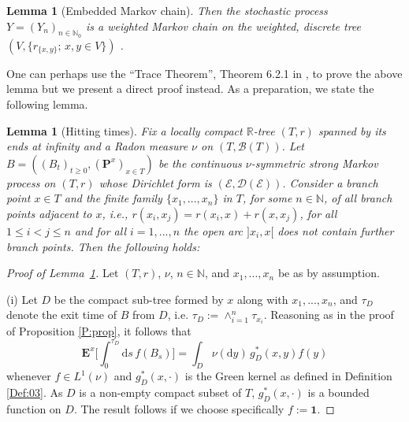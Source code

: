 \documentclass[11pt]{amsart}
\numberwithin{equation}{section}
\newtheorem{lemma}[definition]{Lemma}
\begin{document}
{\begin{lemma}[Embedded Markov chain]
Then the stochastic process $Y=(Y_n)_{n\in\mathbb{N}_0}$ is a weighted Markov chain on the
weighted, discrete tree $(V,\{r_{\{x,y\}};\,x,y\in V\})$ .
\end{lemma}{\smallskip}

One can perhaps use the ``Trace Theorem'', Theorem 6.2.1 in \cite{FukushimaOshimaTakeda1994},  to prove the above lemma but we present a direct proof instead. As a preparation, we state the following lemma.
\begin{lemma}[Hitting times]
Fix a locally compact ${{\mathbb R}}$-tree $(T,r)$ {spanned by its ends at infinity} and a Radon measure $\nu$ on $(T,{\mathcal B}(T))$.
Let $B=((B_t)_{t\ge 0},({\mathbf P}^x)_{x\in T})$ be the continuous $\nu$-symmetric strong Markov process \label{L:hitting}
 on $(T,r)$
whose Dirichlet form is $({\mathcal E}, {\mathcal D}({\mathcal E}))$. Consider a branch point $x\in T$ and the finite family $\{x_1,...,x_n\}$ in $T$, for some $n\in{{\mathbb N}}$, of all branch points adjacent to $x$, i.e., $r(x_i,x_j)=r(x_i,x)+r(x,x_j)$, for all $1\le i<j\le n$ and for all $i=1,...,n$ the open arc $]x_i,x[$ does not contain further branch points.
Then the following holds:
\end{lemma}{\smallskip}

\begin{proof}[Proof of Lemma~\ref{L:hitting}]
Let $(T,r)$, $\nu$, $n\in\mathbb{N}$, and $x_1,...,x_n$ be as by assumption.

(i) Let $D$ be the compact sub-tree formed by $x$ along with $x_{1},..., x_{n}$, and $\tau_D$ denote the exit time of $B$ from $D$, i.e. $\tau_D:=\wedge_{i=1}^{n}\tau_{x_{i}} $.  Reasoning as in the proof of Proposition \ref{P:prop}, it follows that
\begin{equation}
  \mathbf{E}^{x}\big[\int_{0}^{\tau_{D}}\mathrm{d}s\, f(B_{s})\big] = \int_{D}\nu(\mathrm{d}y)\, g^{\ast}_{D}(x,y) f(y)
   \end{equation}
whenever $f \in L^{1}(\nu)$ and $g^{\ast}_{D}(x,\cdot)$ is the Green kernel as defined in  Definition \ref{Def:03}.  As $D$ is a non-empty compact subset of $T$, $g^{\ast}_{D} (x,\boldsymbol{\cdot})$ is a bounded function on $D$.  The result follows if we choose specifically {$f:=\mathbf{1}$.}{\smallskip}


\end{proof}}
\end{document}
